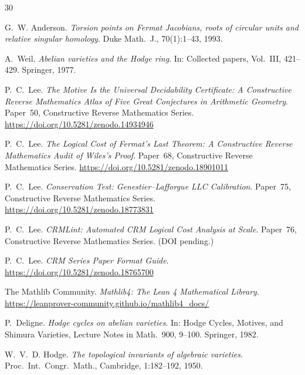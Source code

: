 \documentclass[11pt]{article}
\theoremstyle{plain}
\theoremstyle{definition}
\theoremstyle{remark}
\begin{document}
\begin{thebibliography}{30}

G.~W. Anderson.
\newblock \emph{Torsion points on Fermat Jacobians, roots of circular
  units and relative singular homology}.
\newblock Duke Math.\ J., 70(1):1--43, 1993.

A.~Weil.
\newblock \emph{Abelian varieties and the Hodge ring}.
\newblock In: Collected papers, Vol.~III, 421--429.
  Springer, 1977.

P.~C.~Lee.
\newblock \emph{The Motive Is the Universal Decidability Certificate:
  A Constructive Reverse Mathematics Atlas of Five Great Conjectures
  in Arithmetic Geometry}.
\newblock Paper~50, Constructive Reverse Mathematics Series.
\newblock \url{https://doi.org/10.5281/zenodo.14934946}

P.~C.~Lee.
\newblock \emph{The Logical Cost of Fermat's Last Theorem: A Constructive
  Reverse Mathematics Audit of Wiles's Proof}.
\newblock Paper~68, Constructive Reverse Mathematics Series.
\newblock \url{https://doi.org/10.5281/zenodo.18901011}

P.~C.~Lee.
\newblock \emph{Conservation Test: Genestier--Lafforgue LLC Calibration}.
\newblock Paper~75, Constructive Reverse Mathematics Series.
\newblock \url{https://doi.org/10.5281/zenodo.18773831}

P.~C.~Lee.
\newblock \emph{CRMLint: Automated CRM Logical Cost Analysis at Scale}.
\newblock Paper~76, Constructive Reverse Mathematics Series.
\newblock (DOI pending.)

P.~C.~Lee.
\newblock \emph{CRM Series Paper Format Guide}.
\newblock \url{https://doi.org/10.5281/zenodo.18765700}

The Mathlib Community.
\newblock \emph{Mathlib4: The Lean 4 Mathematical Library}.
\newblock \url{https://leanprover-community.github.io/mathlib4_docs/}

P.~Deligne.
\newblock \emph{Hodge cycles on abelian varieties}.
\newblock In: Hodge Cycles, Motives, and Shimura Varieties,
  Lecture Notes in Math.~900, 9--100. Springer, 1982.

W.~V.~D. Hodge.
\newblock \emph{The topological invariants of algebraic varieties}.
\newblock Proc.\ Int.\ Congr.\ Math., Cambridge, 1:182--192, 1950.


\end{thebibliography}
\end{document}
